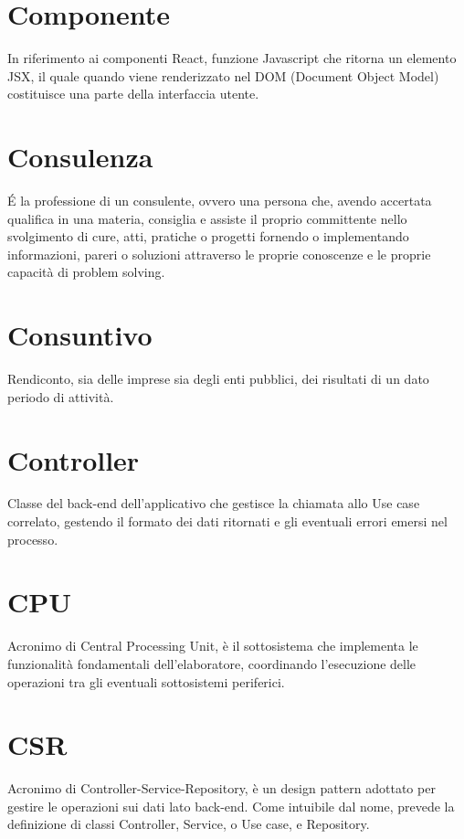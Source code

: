 \section{Componente}\label{sec:Componenti}
In riferimento ai componenti React, funzione Javascript che ritorna un elemento JSX, il quale quando viene renderizzato nel DOM (Document Object Model) costituisce una parte della interfaccia utente.

\section{Consulenza}\label{sec:Consulenze}
É la professione di un consulente, ovvero una persona che, avendo accertata qualifica in una materia, consiglia e assiste il proprio committente nello svolgimento di cure, atti, pratiche o progetti fornendo o implementando informazioni, pareri o soluzioni attraverso le proprie conoscenze e le proprie capacità di problem solving.

\section{Consuntivo}\label{sec:Consuntivi}
Rendiconto, sia delle imprese sia degli enti pubblici, dei risultati di un dato periodo di attività.

\section{Controller}\label{sec:Controllers}
Classe del back-end dell'applicativo che gestisce la chiamata allo Use case correlato, gestendo il formato dei dati ritornati e gli eventuali errori emersi nel processo.

\section{CPU}
Acronimo di Central Processing Unit, è il sottosistema che implementa le funzionalità fondamentali dell'elaboratore, coordinando l'esecuzione delle operazioni tra gli eventuali sottosistemi periferici.

\section{CSR}\label{sec:Controller-Service-Repository}
Acronimo di Controller-Service-Repository, è un design pattern adottato per gestire le operazioni sui dati lato back-end. Come intuibile dal nome, prevede la definizione di classi Controller, Service, o Use case, e Repository.

